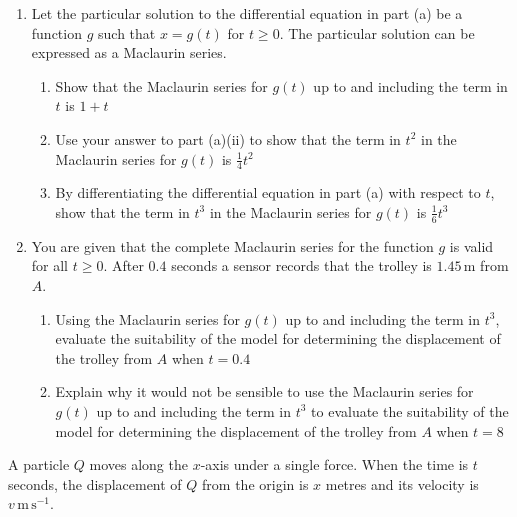 \documentclass[leqno]{article}
\begin{document}
\begin{enumerate}[
  label=\textbf{\arabic*.},
  leftmargin=*,
  topsep=0pt,
  partopsep=0pt,
  parsep=0pt
]
\begin{enumerate}[label=\textbf{(\alph*)}]
\begin{enumerate}[label=(\roman*)]
  \end{enumerate}
  \item Let the particular solution to the differential equation in part (a) be a function $g$ such that $x=g(t)$ for $t\ge 0$. The particular solution can be expressed as a Maclaurin series. \\
  \begin{enumerate}[label=(\roman*)]
    \item Show that the Maclaurin series for $g(t)$ up to and including the term in $t$ is $1+t$ 
    \item Use your answer to part (a)(ii) to show that the term in $t^2$ in the Maclaurin series for $g(t)$ is $\frac{1}{4}t^2$ 
    \item By differentiating the differential equation in part (a) with respect to $t$, show that the term in $t^3$ in the Maclaurin series for $g(t)$ is $\frac{1}{6}t^3$  \\
  \end{enumerate}
  \item You are given that the complete Maclaurin series for the function $g$ is valid for all $t\ge 0$. After $0.4$ seconds a sensor records that the trolley is $1.45\,\mathrm{m}$ from $A$. \\
  \begin{enumerate}[label=(\roman*)]
    \item Using the Maclaurin series for $g(t)$ up to and including the term in $t^3$, evaluate the suitability of the model for determining the displacement of the trolley from $A$ when $t=0.4$  \\
    
    \item Explain why it would not be sensible to use the Maclaurin series for $g(t)$ up to and including the term in $t^3$ to evaluate the suitability of the model for determining the displacement of the trolley from $A$ when $t=8$  \\
  \end{enumerate}
\end{enumerate}

\newpage


\questionitem

A particle $Q$ moves along the $x$-axis under a single force. When the time is $t$ seconds, the displacement of $Q$ from the origin is $x$ metres and its velocity is $v\,\mathrm{m\,s^{-1}}$. \\


\end{enumerate}
\end{document}
